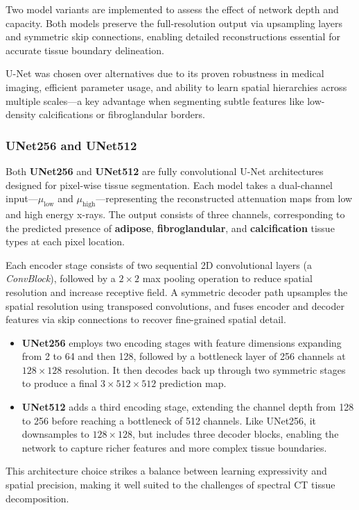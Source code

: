 Two model variants are implemented to assess the effect of network depth and capacity. Both models preserve the 
full-resolution output via upsampling layers and symmetric skip connections, enabling detailed reconstructions 
essential for accurate tissue boundary delineation.

U-Net was chosen over alternatives due to its proven robustness in medical imaging, efficient parameter usage, 
and ability to learn spatial hierarchies across multiple scales—a key advantage when segmenting subtle features 
like low-density calcifications or fibroglandular borders.

\subsubsection{UNet256 and UNet512}

Both \textbf{UNet256} and \textbf{UNet512} are fully convolutional U-Net architectures designed for pixel-wise 
tissue segmentation. Each model takes a dual-channel input—\(\mu_{\text{low}}\) and \(\mu_{\text{high}}\)—representing 
the reconstructed attenuation maps from low and high energy x-rays. The output consists of three channels, corresponding 
to the predicted presence of \textbf{adipose}, \textbf{fibroglandular}, and \textbf{calcification} tissue types at 
each pixel location.

Each encoder stage consists of two sequential 2D convolutional layers (a \textit{ConvBlock}), followed by a 
\(2 \times 2\) max pooling operation to reduce spatial resolution and increase receptive field. A symmetric decoder 
path upsamples the spatial resolution using transposed convolutions, and fuses encoder and decoder features via skip 
connections to recover fine-grained spatial detail.

\begin{itemize}
    \item \textbf{UNet256} employs two encoding stages with feature dimensions expanding from 2 to 64 and then 128, 
          followed by a bottleneck layer of 256 channels at \(128 \times 128\) resolution. It then decodes back up 
          through two symmetric stages to produce a final \(3 \times 512 \times 512\) prediction map.
    \item \textbf{UNet512} adds a third encoding stage, extending the channel depth from 128 to 256 before reaching a 
          bottleneck of 512 channels. Like UNet256, it downsamples to \(128 \times 128\), but includes three decoder 
          blocks, enabling the network to capture richer features and more complex tissue boundaries.
\end{itemize}

This architecture choice strikes a balance between learning expressivity and spatial precision, making it well suited to 
the challenges of spectral CT tissue decomposition.
